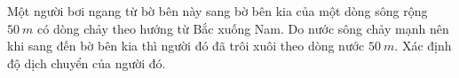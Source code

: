 \begin{ex}
	Một người bơi ngang từ bờ bên này sang bờ bên kia của một dòng sông rộng $\SI{50}{m}$ có dòng chảy theo hướng từ Bắc xuống Nam. Do nước sông chảy mạnh nên khi sang đến bờ bên kia thì người đó đã trôi xuôi theo dòng nước $\SI{50}{m}$. Xác định độ dịch chuyển của người đó.
\end{ex}
